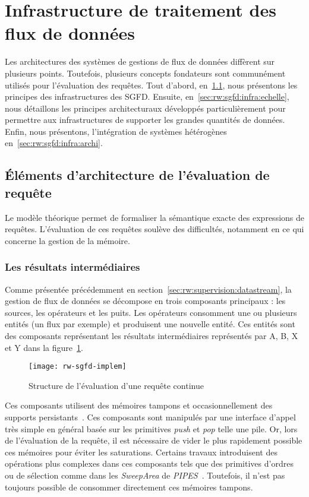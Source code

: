 \section{Infrastructure de traitement des flux de données}\label{sec:rw:sgfd:infra}
Les architectures des systèmes de gestions de flux de données diffèrent sur plusieurs points. Toutefois, plusieurs concepts fondateurs sont communément utilisés pour l'évaluation des requêtes. Tout d'abord, en~\ref{sec:rw:sgfd:infra:eval}, nous présentons les principes des infrastructures des SGFD. Ensuite, en~\ref{sec:rw:sgfd:infra:echelle}, nous détaillons les principes architecturaux développés particulièrement pour permettre aux infrastructures de supporter les grandes quantités de données. Enfin, nous présentons, l'intégration de systèmes hétérogènes en~\ref{sec:rw:sgfd:infra:archi}.

\subsection{Éléments d'architecture de l'évaluation de requête}\label{sec:rw:sgfd:infra:eval}
Le modèle théorique permet de formaliser la sémantique exacte des expressions de requêtes. L'évaluation de ces requêtes soulève des difficultés, notamment en ce qui concerne la gestion de la mémoire.

\subsubsection{Les résultats intermédiaires}
Comme présentée précédemment en section~\ref{sec:rw:supervision:datastream}, la gestion de flux de données se décompose en trois composants principaux : les sources, les opérateurs et les puits. Les opérateurs consomment une ou plusieurs entités (un flux par exemple) et produisent une nouvelle entité. Ces entités sont des composants représentant les résultats intermédiaires représentés par A, B, X et Y dans la figure~\ref{fig:rw:sgfd:implem}.
\begin{figure}[ht]
    \centering
    \texttt{[image: rw-sgfd-implem]}
    \caption{Structure de l'évaluation d'une requête continue}\label{fig:rw:sgfd:implem}
\end{figure}

Ces composants utilisent des mémoires tampons et occasionnellement des supports persistants~\cite{Abadi:aurora}. Ces composants sont manipulés par une interface d'appel très simple en général basée sur les primitives \textit{push} et \textit{pop} telle une pile. Or, lors de l'évaluation de la requête, il est nécessaire de vider le plus rapidement possible ces mémoires pour éviter les saturations. Certains travaux introduisent des opérations plus complexes dans ces composants tels que des primitives d'ordres ou de sélection comme dans les \textit{SweepArea} de \textit{PIPES}~\cite{Kramer:semantics}. Toutefois, il n'est pas toujours possible de consommer directement ces mémoires tampons.

